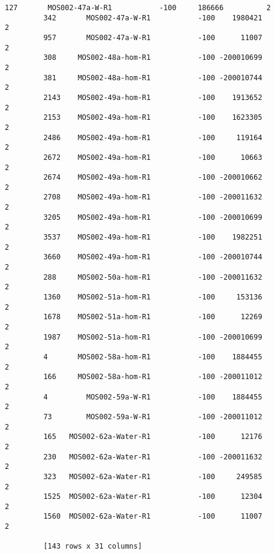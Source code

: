 \documentclass[11pt]{article}
\begin{document}
\begin{Verbatim}[commandchars=\\\{\}]
         127       MOS002-47a-W-R1           -100     186666          2  
         342       MOS002-47a-W-R1           -100    1980421          2  
         957       MOS002-47a-W-R1           -100      11007          2  
         308     MOS002-48a-hom-R1           -100 -200010699          2  
         381     MOS002-48a-hom-R1           -100 -200010744          2  
         2143    MOS002-49a-hom-R1           -100    1913652          2  
         2153    MOS002-49a-hom-R1           -100    1623305          2  
         2486    MOS002-49a-hom-R1           -100     119164          2  
         2672    MOS002-49a-hom-R1           -100      10663          2  
         2674    MOS002-49a-hom-R1           -100 -200010662          2  
         2708    MOS002-49a-hom-R1           -100 -200011632          2  
         3205    MOS002-49a-hom-R1           -100 -200010699          2  
         3537    MOS002-49a-hom-R1           -100    1982251          2  
         3660    MOS002-49a-hom-R1           -100 -200010744          2  
         288     MOS002-50a-hom-R1           -100 -200011632          2  
         1360    MOS002-51a-hom-R1           -100     153136          2  
         1678    MOS002-51a-hom-R1           -100      12269          2  
         1987    MOS002-51a-hom-R1           -100 -200010699          2  
         4       MOS002-58a-hom-R1           -100    1884455          2  
         166     MOS002-58a-hom-R1           -100 -200011012          2  
         4         MOS002-59a-W-R1           -100    1884455          2  
         73        MOS002-59a-W-R1           -100 -200011012          2  
         165   MOS002-62a-Water-R1           -100      12176          2  
         230   MOS002-62a-Water-R1           -100 -200011632          2  
         323   MOS002-62a-Water-R1           -100     249585          2  
         1525  MOS002-62a-Water-R1           -100      12304          2  
         1560  MOS002-62a-Water-R1           -100      11007          2  
         
         [143 rows x 31 columns]
\end{Verbatim}
            
\end{document}
